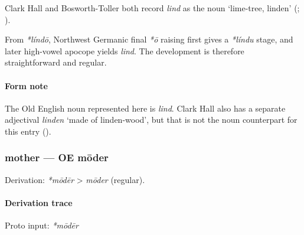 \documentclass[
  british,
  a4paper,
]{article}
\begin{document}
Clark Hall and Bosworth-Toller both record \emph{lind} as the noun
`lime-tree, linden' (;
).

From \emph{*líndō}, Northwest Germanic final \emph{*ō} raising first
gives a \emph{*líndu} stage, and later high-vowel apocope yields
\emph{lind}. The development is therefore straightforward and regular.

\paragraph{Form note}\label{form-note-3}

The Old English noun represented here is \emph{lind}. Clark Hall also
has a separate adjectival \emph{linden} `made of linden-wood', but that
is not the noun counterpart for this entry
().

\subsubsection{mother --- OE mōder}\label{mother-oe-mux14dder-1}

Derivation: \emph{*mōdēr} \textgreater{} \emph{mōder} (regular).

\paragraph{Derivation trace}\label{derivation-trace-21}

Proto input: \emph{*mōdēr}

\begingroup
\setlength{\fboxsep}{6pt}
\end{document}
